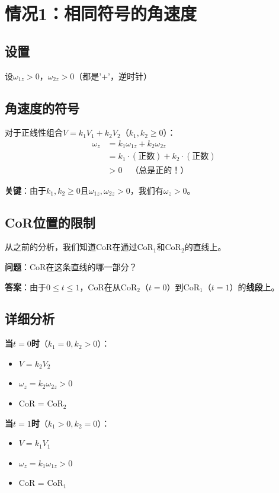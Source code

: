 \documentclass[12pt,a4paper]{article}
\begin{document}
\section{情况1：相同符号的角速度}

\subsection{设置}

设$\omega_{1z} > 0$，$\omega_{2z} > 0$（都是'+'，逆时针）

\subsection{角速度的符号}

对于正线性组合$V = k_1 V_1 + k_2 V_2$（$k_1, k_2 \geq 0$）：
\begin{align}
\omega_z &= k_1 \omega_{1z} + k_2 \omega_{2z} \\
&= k_1 \cdot (\text{正数}) + k_2 \cdot (\text{正数}) \\
&> 0 \quad \text{（总是正的！）}
\end{align}

\textbf{关键}：由于$k_1, k_2 \geq 0$且$\omega_{1z}, \omega_{2z} > 0$，我们有$\omega_z > 0$。

\subsection{CoR位置的限制}

从之前的分析，我们知道CoR在通过CoR$_1$和CoR$_2$的直线上。

\textbf{问题}：CoR在这条直线的哪一部分？

\textbf{答案}：由于$0 \leq t \leq 1$，CoR在从CoR$_2$（$t=0$）到CoR$_1$（$t=1$）的\textbf{线段}上。

\subsection{详细分析}

\textbf{当$t = 0$时}（$k_1 = 0, k_2 > 0$）：
\begin{itemize}
\item $V = k_2 V_2$
\item $\omega_z = k_2 \omega_{2z} > 0$
\item CoR = CoR$_2$
\end{itemize}

\textbf{当$t = 1$时}（$k_1 > 0, k_2 = 0$）：
\begin{itemize}
\item $V = k_1 V_1$
\item $\omega_z = k_1 \omega_{1z} > 0$
\item CoR = CoR$_1$
\end{itemize}
\end{document}
